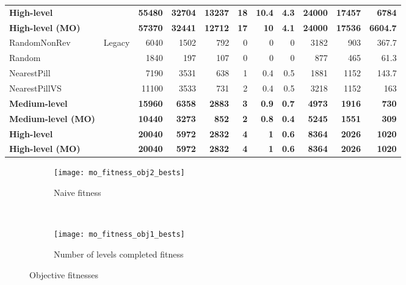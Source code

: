 \documentclass{llncs}
\begin{document}
\begin{table}[H]
\begin{tabular}{|l|c|r|r|r|r|r|r|r|r|r|}
\textbf{High-level} &  & \textbf{55480} & \textbf{32704} & \textbf{13237} & \textbf{18} & \textbf{10.4} & \textbf{4.3} & \textbf{24000} & \textbf{17457} & \textbf{6784} \\ \cline{1-1} \cline{3-11} 
\textbf{High-level (MO)} &  & \textbf{57370} & \textbf{32441} & \textbf{12712} & \textbf{17} & \textbf{10} & \textbf{4.1} & \textbf{24000} & \textbf{17536} & \textbf{6604.7} \\ \hline
RandomNonRev & \multirow{8}{*}{Legacy} & 6040 & 1502 & 792 & 0 & 0 & 0 & 3182 & 903 & 367.7 \\ \cline{1-1} \cline{3-11} 
Random &  & 1840 & 197 & 107 & 0 & 0 & 0 & 877 & 465 & 61.3 \\ \cline{1-1} \cline{3-11} 
NearestPill &  & 7190 & 3531 & 638 & 1 & 0.4 & 0.5 & 1881 & 1152 & 143.7 \\ \cline{1-1} \cline{3-11} 
NearestPillVS &  & 11100 & 3533 & 731 & 2 & 0.4 & 0.5 & 3218 & 1152 & 163 \\ \cline{1-1} \cline{3-11} 
\textbf{Medium-level} &  & \textbf{15960} & \textbf{6358} & \textbf{2883} & \textbf{3} & \textbf{0.9} & \textbf{0.7} & \textbf{4973} & \textbf{1916} & \textbf{730} \\ \cline{1-1} \cline{3-11} 
\textbf{Medium-level (MO)} &  & \textbf{10440} & \textbf{3273} & \textbf{852} & \textbf{2} & \textbf{0.8} & \textbf{0.4} & \textbf{5245} & \textbf{1551} & \textbf{309} \\ \cline{1-1} \cline{3-11} 
\textbf{High-level} &  & \textbf{20040} & \textbf{5972} & \textbf{2832} & \textbf{4} & \textbf{1} & \textbf{0.6} & \textbf{8364} & \textbf{2026} & \textbf{1020} \\ \cline{1-1} \cline{3-11} 
\textbf{High-level (MO)} &  & \textbf{20040} & \textbf{5972} & \textbf{2832} & \textbf{4} & \textbf{1} & \textbf{0.6} & \textbf{8364} & \textbf{2026} & \textbf{1020} \\ \hline
\end{tabular}
\end{table}

\begin{figure}[H]
    \centering
    \begin{subfigure}[b]{\textwidth}
        \texttt{[image: mo\_fitness\_obj2\_bests]}
        \caption{Naive fitness}
        \label{fig:mo_fitness1}
    \end{subfigure}
    ~ %
    \begin{subfigure}[b]{\textwidth}
        \texttt{[image: mo\_fitness\_obj1\_bests]}
        \caption{Number of levels completed fitness}
        \label{fig:mo_fitness1}
    \end{subfigure}
    \caption{Objective fitnesses}\label{fig:Objective evolution}
\end{figure}
\end{document}

